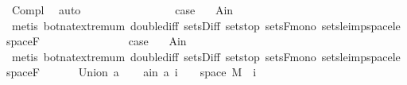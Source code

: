 \begin{isabellebody}
\ Compl{\isacharparenleft}{\kern0pt}{}{\isacharcomma}{\kern0pt}{}{\isacharparenright}{\kern0pt}\ \isamarkupfalse%
\ auto\isanewline
\ \ \isacommand{{\isacharbraceleft}{\kern0pt}}\isamarkupfalse%
\isanewline
\ \ \ \ \isamarkupfalse%
\ {}\isanewline
\ \ \ \ \isamarkupfalse%
\ \isamarkupfalse%
\ {\isacharquery}{\kern0pt}case\ \isamarkupfalse%
\ {\isacharasterisk}{\kern0pt}\ A{\isacharunderscore}{\kern0pt}in\ \isamarkupfalse%
\ {\isacharparenleft}{\kern0pt}metis\ bot{\isacharunderscore}{\kern0pt}nat{\isacharunderscore}{\kern0pt}{}{\isachardot}{\kern0pt}extremum\ double{\isacharunderscore}{\kern0pt}diff\ sets{\isachardot}{\kern0pt}Diff\ sets{\isachardot}{\kern0pt}top\ sets{\isacharunderscore}{\kern0pt}F{\isacharunderscore}{\kern0pt}mono\ sets{\isacharunderscore}{\kern0pt}le{\isacharunderscore}{\kern0pt}imp{\isacharunderscore}{\kern0pt}space{\isacharunderscore}{\kern0pt}le\ space{\isacharunderscore}{\kern0pt}F{\isacharparenright}{\kern0pt}\isanewline
\ \isamarkupfalse%
\isanewline
\ \ \ \ \isamarkupfalse%
\ {}\isanewline
\ \ \ \ \isamarkupfalse%
\ \isamarkupfalse%
\ {\isacharquery}{\kern0pt}case\ \isamarkupfalse%
\ {\isacharasterisk}{\kern0pt}\ A{\isacharunderscore}{\kern0pt}in\ \isamarkupfalse%
\ {\isacharparenleft}{\kern0pt}metis\ bot{\isacharunderscore}{\kern0pt}nat{\isacharunderscore}{\kern0pt}{}{\isachardot}{\kern0pt}extremum\ double{\isacharunderscore}{\kern0pt}diff\ sets{\isachardot}{\kern0pt}Diff\ sets{\isachardot}{\kern0pt}top\ sets{\isacharunderscore}{\kern0pt}F{\isacharunderscore}{\kern0pt}mono\ sets{\isacharunderscore}{\kern0pt}le{\isacharunderscore}{\kern0pt}imp{\isacharunderscore}{\kern0pt}space{\isacharunderscore}{\kern0pt}le\ space{\isacharunderscore}{\kern0pt}F{\isacharparenright}{\kern0pt}\isanewline
\ \ \isacommand{{\isacharbraceright}{\kern0pt}}\isamarkupfalse%
\isanewline
{}\isamarkupfalse%
\isanewline
\ \ \isamarkupfalse%
\ {\isacharparenleft}{\kern0pt}Union\ a{\isacharparenright}{\kern0pt}\isanewline
\ \ \isamarkupfalse%
\ a{\isacharunderscore}{\kern0pt}in{\isacharcolon}{\kern0pt}\ {\isachardoublequoteopen}a\ i\ {\isasymsubseteq}\ {\isacharbraceleft}{\kern0pt}{}{\isachardot}{\kern0pt}{\isachardot}{\kern0pt}{\isacharbraceright}{\kern0pt}\ {\isasymtimes}\ space\ M{\isachardoublequoteclose}\ \ i\ \isamarkupfalse%

\end{isabellebody}
